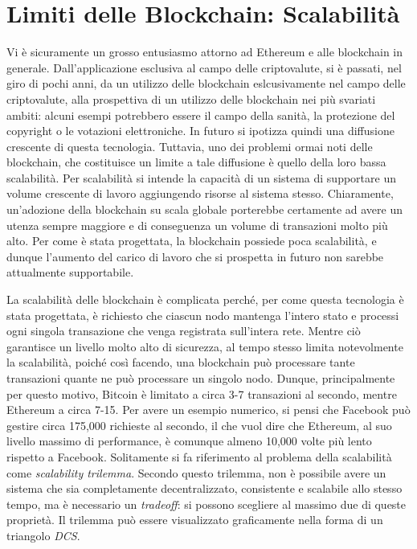\section{Limiti delle Blockchain: Scalabilità}

Vi è sicuramente un grosso entusiasmo attorno ad Ethereum e alle blockchain in generale. Dall'applicazione esclusiva al campo delle criptovalute, si è passati, nel giro di pochi anni, da un utilizzo delle blockchain eslcusivamente nel campo delle criptovalute, alla prospettiva di un utilizzo delle blockchain nei più svariati ambiti: alcuni esempi potrebbero essere il campo della sanità, la protezione del copyright o le votazioni elettroniche. In futuro si ipotizza quindi una diffusione crescente di questa tecnologia. Tuttavia, uno dei problemi ormai noti delle blockchain, che costituisce un limite a tale diffusione è quello della loro bassa scalabilità. Per scalabilità si intende la capacità di un sistema di supportare un volume crescente di lavoro aggiungendo risorse al sistema stesso. Chiaramente, un'adozione della blockchain su scala globale porterebbe certamente ad avere un utenza sempre maggiore e di conseguenza un volume di transazioni molto più alto. Per come è stata progettata, la blockchain possiede poca scalabilità, e dunque l'aumento del carico di lavoro che si prospetta in futuro non sarebbe attualmente supportabile.

La scalabilità delle blockchain è complicata perché, per come questa tecnologia è stata progettata, è richiesto che ciascun nodo mantenga l'intero stato e processi ogni singola transazione che venga registrata sull'intera rete. Mentre ciò garantisce un livello molto alto di sicurezza, al tempo stesso limita notevolmente la scalabilità, poiché così facendo, una blockchain può processare tante transazioni quante ne può processare un singolo nodo. Dunque, principalmente per questo motivo, Bitcoin è limitato a circa 3-7 transazioni al secondo, mentre Ethereum a circa 7-15. Per avere un esempio numerico, si pensi che Facebook può gestire circa 175,000 richieste al secondo, il che vuol dire che Ethereum, al suo livello massimo di performance, è comunque almeno 10,000 volte più lento rispetto a Facebook. 
Solitamente si fa riferimento al problema della scalabilità come \textit{scalability trilemma}. Secondo questo trilemma, non è possibile avere un sistema che sia completamente decentralizzato, consistente e scalabile allo stesso tempo, ma è necessario un \textit{tradeoff}: si possono scegliere al massimo due di queste proprietà. Il trilemma può essere visualizzato graficamente nella forma di un triangolo \textit{DCS}.

